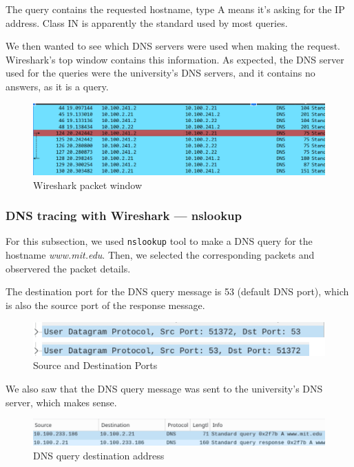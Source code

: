 The query contains the requested hostname, type A means it's asking for the IP
address. Class IN is apparently the standard used by most queries.

We then wanted to see which DNS servers were used when making the request.
Wireshark's top window contains this information. As expected, the DNS server
used for the queries were the university's DNS servers, and it contains no
answers, as it is a query.

\begin{figure}[htbp]
    \centering
    \includegraphics[width=1\linewidth]{img/14.png}
    \caption{Wireshark packet window}\label{fig:14}
\end{figure}

\subsubsection{DNS tracing with Wireshark --- nslookup}
For this subsection, we used \texttt{nslookup} tool to make a DNS query for the
hostname \textit{www.mit.edu}. Then, we selected the corresponding packets and
observered the packet details.

The destination port for the DNS query message is 53 (default DNS port), which
is also the source port of the response message.

\begin{figure}[htbp]
    \centering
    \includegraphics[width=1\linewidth]{img/15.png}
    \caption{Source and Destination Ports}\label{fig:15}
\end{figure}

We also saw that the DNS query message was sent to the university's DNS server,
which makes sense.

\begin{figure}[htbp]
    \centering
    \includegraphics[width=1\linewidth]{img/16.png}
    \caption{DNS query destination address}\label{fig:16}
\end{figure}

